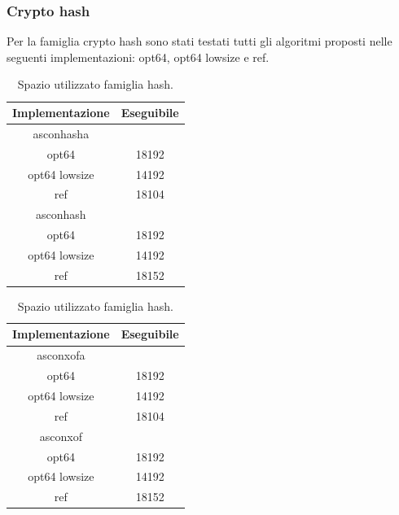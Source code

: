 \documentclass[12pt,a4paper,italian]{report}
\begin{document}
\subsubsection{Crypto hash}

Per la famiglia crypto hash sono stati testati tutti gli algoritmi proposti nelle seguenti implementazioni: opt64, opt64 lowsize e ref.

\begin{table}[h]
    \caption{Spazio utilizzato famiglia hash.}
    \begin{minipage}[t]{0.5\linewidth}
        \centering
        \begin{tabular}{|c|c|}
            \hline
            Implementazione & Eseguibile \\
            \hline
            asconhasha & \\
            \hline
            opt64 & 18192 \\
            \hline
            opt64 lowsize & 14192 \\
            \hline
            ref & 18104 \\
            \hline
            asconhash & \\
            \hline
            opt64 & 18192 \\
            \hline
            opt64 lowsize & 14192 \\
            \hline
            ref & 18152 \\
            \hline
        \end{tabular}
    \end{minipage}
    \begin{minipage}[t]{0.5\linewidth}
        \centering
        \begin{tabular}{|c|c|}
            \hline
            Implementazione & Eseguibile \\
            \hline
            asconxofa & \\
            \hline
            opt64 & 18192 \\
            \hline
            opt64 lowsize & 14192 \\
            \hline
            ref & 18104 \\
            \hline
            asconxof & \\
            \hline
            opt64 & 18192 \\
            \hline
            opt64 lowsize & 14192 \\
            \hline
            ref & 18152 \\
            \hline
        \end{tabular}
    \end{minipage}
\end{table}
\end{document}
